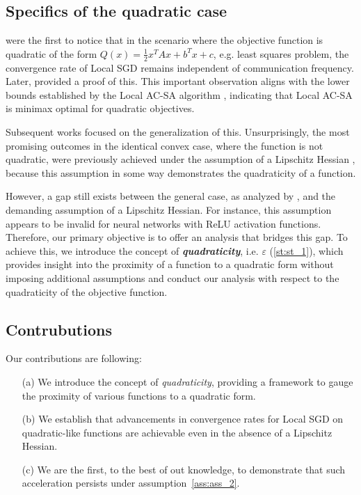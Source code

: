 \subsection{Specifics of the quadratic case}

\cite{earlyquadratics} were the first to notice that in the scenario where the objective function is quadratic of the form $Q(x) = \frac{1}{2}x^T A x + b^T x + c$, e.g. least squares problem, the convergence rate of Local SGD remains independent of communication frequency. Later, \cite{Woodworth} provided a proof of this. This important observation aligns with the lower bounds established by the Local AC-SA algorithm \citep{Woodworth, AC-SA}, indicating that Local AC-SA is minimax optimal for quadratic objectives.

\vspace{10pt}

Subsequent works focused on the generalization of this. Unsurprisingly, the most promising outcomes in the identical convex case, where the function is not quadratic, were previously achieved under the assumption of a Lipschitz Hessian \citep{FedAC, Spiridonoff}, because this assumption in some way demonstrates the quadraticity of a function.

\vspace{10pt}

However, a gap still exists between the general case, as analyzed by \cite{Khaled}, and the 
{\color{red}
demanding assumption of a Lipschitz Hessian. For instance, this assumption appears to be invalid for neural networks with ReLU activation functions. 
}
Therefore, our primary objective is to offer an analysis that bridges this gap. To achieve this, we introduce the concept of \textbf{\textit{quadraticity}}, i.e. $\varepsilon$ (\ref{st:st_1}), which provides insight into the proximity of a function to a quadratic form without imposing additional assumptions and conduct our analysis with respect to the quadraticity of the objective function.

\subsection{Contrubutions}

Our contributions are following:

\begin{itemize}
    \item[(a)] We introduce the concept of \textit{quadraticity}, providing a framework to gauge the proximity of various functions to a quadratic form.

    \item[(b)] We establish that advancements in convergence rates for Local SGD on quadratic-like functions are achievable even in the absence of a Lipschitz Hessian.
    
    \item[(c)] We are the first, to the best of out knowledge, to demonstrate that such acceleration persists under assumption~\ref{ass:ass_2}.
\end{itemize}

